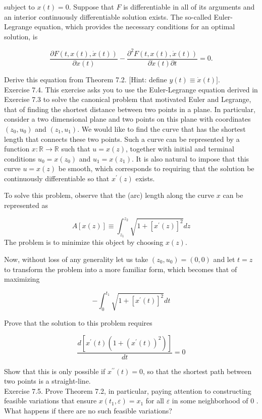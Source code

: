 \documentclass[\topdir/lecture_notes.tex]{subfiles}
\begin{document}
subject to $x(t)=0$. Suppose that $F$ is differentiable in all of its arguments and an interior continuously differentiable solution exists. The so-called Euler-Legrange equation, which provides the necessary conditions for an optimal solution, is

\[
\frac{\partial F(t, x(t), \dot{x}(t))}{\partial x(t)}-\frac{\partial^{2} F(t, x(t), \dot{x}(t))}{\partial \dot{x}(t) \partial t}=0 .
\]

Derive this equation from Theorem 7.2. [Hint: define $y(t) \equiv \dot{x}(t)]$.\\
Exercise 7.4. This exercise asks you to use the Euler-Legrange equation derived in Exercise 7.3 to solve the canonical problem that motivated Euler and Legrange, that of finding the shortest distance between two points in a plane. In particular, consider a two dimensional plane and two points on this plane with coordinates $\left(z_{0}, u_{0}\right)$ and $\left(z_{1}, u_{1}\right)$. We would like to find the curve that has the shortest length that connects these two points. Such a curve can be represented by a function $x: \mathbb{R} \rightarrow \mathbb{R}$ such that $u=x(z)$, together with initial and terminal conditions $u_{0}=x\left(z_{0}\right)$ and $u_{1}=x\left(z_{1}\right)$. It is also natural to impose that this curve $u=x(z)$ be smooth, which corresponds to requiring that the solution be continuously differentiable so that $x^{\prime}(z)$ exists.

To solve this problem, observe that the (arc) length along the curve $x$ can be represented as

\[
A[x(z)] \equiv \int_{z_{1}}^{z_{2}} \sqrt{1+\left[x^{\prime}(z)\right]^{2}} d z
\]
The problem is to minimize this object by choosing $x(z)$.

Now, without loss of any generality let us take $\left(z_{0}, u_{0}\right)=(0,0)$ and let $t=z$ to transform the problem into a more familiar form, which becomes that of maximizing

\[
-\int_{0}^{t_{1}} \sqrt{1+\left[x^{\prime}(t)\right]^{2}} d t
\]

Prove that the solution to this problem requires

\[
\frac{d\left[x^{\prime}(t)\left(1+\left(x^{\prime}(t)\right)^{2}\right)\right]}{d t}=0
\]

Show that this is only possible if $x^{\prime \prime}(t)=0$, so that the shortest path between two points is a straight-line.\\
Exercise 7.5. Prove Theorem 7.2, in particular, paying attention to constructing feasible variations that ensure $x\left(t_{1}, \varepsilon\right)=x_{1}$ for all $\varepsilon$ in some neighborhood of 0 . What happens if there are no such feasible variations?
\end{document}
